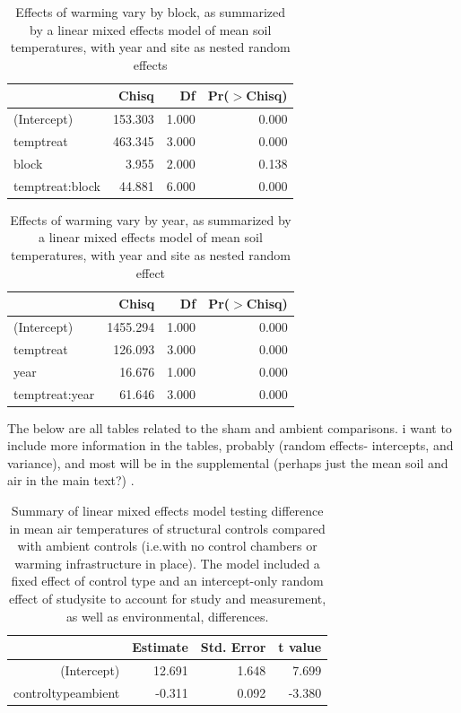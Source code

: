 \documentclass{article}
\begin{document}
\begin{table}[ht]
\centering
\begin{tabular}{lrrr}
  \hline
 & Chisq & Df & Pr($>$Chisq) \\ 
  \hline
(Intercept) & 153.303 & 1.000 & 0.000 \\ 
  temptreat & 463.345 & 3.000 & 0.000 \\ 
  block & 3.955 & 2.000 & 0.138 \\ 
  temptreat:block & 44.881 & 6.000 & 0.000 \\ 
   \hline
\end{tabular}
\caption{Effects of warming vary by block, as summarized by a linear mixed effects model of mean soil temperatures, with year and site as nested random effects} 
\end{table}
\begin{table}[ht]
\centering
\begin{tabular}{lrrr}
  \hline
 & Chisq & Df & Pr($>$Chisq) \\ 
  \hline
(Intercept) & 1455.294 & 1.000 & 0.000 \\ 
  temptreat & 126.093 & 3.000 & 0.000 \\ 
  year & 16.676 & 1.000 & 0.000 \\ 
  temptreat:year & 61.646 & 3.000 & 0.000 \\ 
   \hline
\end{tabular}
\caption{Effects of warming vary by year, as summarized by a linear mixed effects model of mean soil temperatures, with year and site as nested random effect} 
\end{table}\par The below are all tables related to the sham and ambient comparisons. i want to include more information in the tables, probably (random effects- intercepts, and variance), and most will be in the supplemental (perhaps just the mean soil and air in the main text?)
.
\par 
\begin{table}[ht]
\centering
\begin{tabular}{rrrr}
  \hline
 & Estimate & Std. Error & t value \\ 
  \hline
(Intercept) & 12.691 & 1.648 & 7.699 \\ 
  controltypeambient & -0.311 & 0.092 & -3.380 \\ 
   \hline
\end{tabular}
\caption{Summary of linear mixed effects model testing difference in mean air temperatures of structural controls compared with ambient controls (i.e.with no control chambers or warming infrastructure in place). The model included a fixed effect of control type and an intercept-only random effect of studysite to account for study and measurement, as well as environmental, differences.} 
\end{table}
\end{document}
